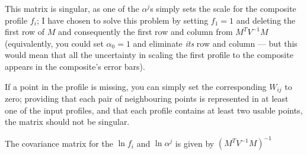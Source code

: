 \documentclass[12pt]{article}
\begin{document}

This matrix is singular, as one of the $\alpha^j$s simply sets the scale
for the composite profile $f_i$; I have chosen to solve this problem by
setting $f_1 = 1$ and deleting the first row of $M$ and consequently the first row and column from
$M^T V^{-1}\! M$ (equivalently, you could set $\alpha_0 = 1$ and eliminate {\em its} row
and column --- but this would mean that all the uncertainty in scaling the
first profile to the composite appears in the composite's error bars).

If a point in the profile is missing, you can simply set the corresponding
$W_{ij}$ to zero; providing that each pair of neighbouring points is
represented in at least one of the input profiles, and that each profile
contains at least two usable points, the matrix should not be singular.

The covariance matrix for the $\ln f_i$ and $\ln\alpha^j$ is given by
$\left(M^T V^{-1}\! M\right)^{-1}$
\end{document}
